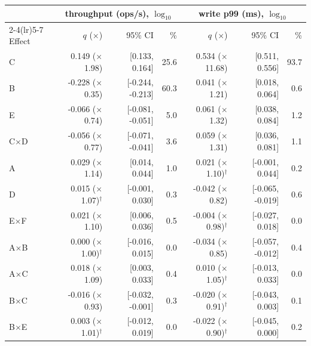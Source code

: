 \begin{tabular}{@{}lrrrrrr@{}}
\toprule
 & \multicolumn{3}{c}{throughput (ops/s), $\log_{10}$} & \multicolumn{3}{c}{write p99 (ms), $\log_{10}$} \\
\cmidrule(lr){2-4}\cmidrule(lr){5-7}
Effect & $q$ ($\times$) & 95\% CI & \% & $q$ ($\times$) & 95\% CI & \% \\
\midrule
C & 0.149 ($\times$1.98) & [0.133, 0.164] & 25.6 & 0.534 ($\times$11.68) & [0.511, 0.556] & 93.7 \\
B & -0.228 ($\times$0.35) & [-0.244, -0.213] & 60.3 & 0.041 ($\times$1.21) & [0.018, 0.064] & 0.6 \\
E & -0.066 ($\times$0.74) & [-0.081, -0.051] & 5.0 & 0.061 ($\times$1.32) & [0.038, 0.084] & 1.2 \\
C$\times$D & -0.056 ($\times$0.77) & [-0.071, -0.041] & 3.6 & 0.059 ($\times$1.31) & [0.036, 0.081] & 1.1 \\
A & 0.029 ($\times$1.14) & [0.014, 0.044] & 1.0 & 0.021 ($\times$1.10)$^\dagger$ & [-0.001, 0.044] & 0.2 \\
D & 0.015 ($\times$1.07)$^\dagger$ & [-0.001, 0.030] & 0.3 & -0.042 ($\times$0.82) & [-0.065, -0.019] & 0.6 \\
E$\times$F & 0.021 ($\times$1.10) & [0.006, 0.036] & 0.5 & -0.004 ($\times$0.98)$^\dagger$ & [-0.027, 0.018] & 0.0 \\
A$\times$B & 0.000 ($\times$1.00)$^\dagger$ & [-0.016, 0.015] & 0.0 & -0.034 ($\times$0.85) & [-0.057, -0.012] & 0.4 \\
A$\times$C & 0.018 ($\times$1.09) & [0.003, 0.033] & 0.4 & 0.010 ($\times$1.05)$^\dagger$ & [-0.013, 0.033] & 0.0 \\
B$\times$C & -0.016 ($\times$0.93) & [-0.032, -0.001] & 0.3 & -0.020 ($\times$0.91)$^\dagger$ & [-0.043, 0.003] & 0.1 \\
B$\times$E & 0.003 ($\times$1.01)$^\dagger$ & [-0.012, 0.019] & 0.0 & -0.022 ($\times$0.90)$^\dagger$ & [-0.045, 0.000] & 0.2 \\
\bottomrule
\end{tabular}
